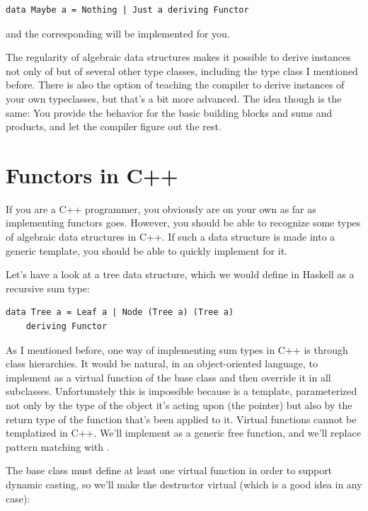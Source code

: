 \begin{Verbatim}[commandchars=\\\{\}]
data Maybe a = Nothing | Just a deriving Functor
\end{Verbatim}
and the corresponding  will be implemented for you.

The regularity of algebraic data structures makes it possible to derive
instances not only of  but of several other type
classes, including the  type class I mentioned before. There
is also the option of teaching the compiler to derive instances of your
own typeclasses, but that's a bit more advanced. The idea though is the
same: You provide the behavior for the basic building blocks and sums
and products, and let the compiler figure out the rest.

\section{Functors in C++}\label{functors-in-c}

If you are a C++ programmer, you obviously are on your own as far as
implementing functors goes. However, you should be able to recognize
some types of algebraic data structures in C++. If such a data structure
is made into a generic template, you should be able to quickly implement
 for it.

Let's have a look at a tree data structure, which we would define in
Haskell as a recursive sum type:

\begin{Verbatim}
data Tree a = Leaf a | Node (Tree a) (Tree a)
    deriving Functor
\end{Verbatim}
As I mentioned before, one way of implementing sum types in C++ is
through class hierarchies. It would be natural, in an object-oriented
language, to implement  as a virtual function of the base
class  and then override it in all subclasses.
Unfortunately this is impossible because  is a template,
parameterized not only by the type of the object it's acting upon (the
 pointer) but also by the return type of the function
that's been applied to it. Virtual functions cannot be templatized in
C++. We'll implement  as a generic free function, and we'll
replace pattern matching with .

The base class must define at least one virtual function in order to
support dynamic casting, so we'll make the destructor virtual (which is
a good idea in any case):

